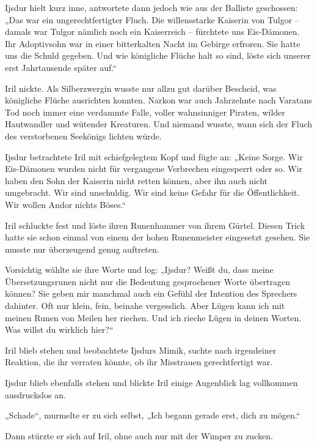 Ijsdur hielt kurz inne, antwortete dann jedoch wie aus der Balliste geschossen: „Das war ein ungerechtfertigter Fluch. Die willensstarke Kaiserin von Tulgor – damals war Tulgor nämlich noch ein Kaiserreich – fürchtete uns Eis-Dämonen. Ihr Adoptivsohn war in einer bitterkalten Nacht im Gebirge erfroren. Sie hatte uns die Schuld gegeben. Und wie königliche Flüche halt so sind, löste sich unserer erst Jahrtausende später auf.“

Iril nickte. Als Silberzwergin wusste nur allzu gut darüber Bescheid, was königliche Flüche ausrichten konnten. Narkon war auch Jahrzehnte nach Varatans Tod noch immer eine verdammte Falle, voller wahnsinniger Piraten, wilder Hautwandler und wütender Kreaturen. Und niemand wusste, wann sich der Fluch des verstorbenen Seekönigs lichten würde.

Ijsdur betrachtete Iril mit schiefgelegtem Kopf und fügte an: „Keine Sorge. Wir Eis-Dämonen wurden nicht für vergangene Verbrechen eingesperrt oder so. Wir haben den Sohn der Kaiserin nicht retten können, aber ihn auch nicht umgebracht. Wir sind unschuldig. Wir sind keine Gefahr für die Öffentlichkeit. Wir wollen Andor nichts Böses.“

Iril schluckte fest und löste ihren Runenhammer von ihrem Gürtel. Diesen Trick hatte sie schon einmal von einem der hohen Runenmeister eingesetzt gesehen. Sie musste nur überzeugend genug auftreten.

Vorsichtig wählte sie ihre Worte und log: „Ijsdur? Weißt du, dass meine Übersetzungsrunen nicht nur die Bedeutung gesprochener Worte übertragen können? Sie geben mir manchmal auch ein Gefühl der Intention des Sprechers dahinter. Oft nur klein, fein, beinahe vergesslich. Aber Lügen kann ich mit meinen Runen von Meilen her riechen. Und ich rieche Lügen in deinen Worten. Was willst du wirklich hier?“

Iril blieb stehen und beobachtete Ijsdurs Mimik, suchte nach irgendeiner Reaktion, die ihr verraten könnte, ob ihr Misstrauen gerechtfertigt war.

Ijsdur blieb ebenfalls stehen und blickte Iril einige Augenblick lag vollkommen ausdruckslos an.

„Schade“, murmelte er zu sich selbst, „Ich begann gerade erst, dich zu mögen.“

Dann stürzte er sich auf Iril, ohne auch nur mit der Wimper zu zucken.



\trennzeichen



